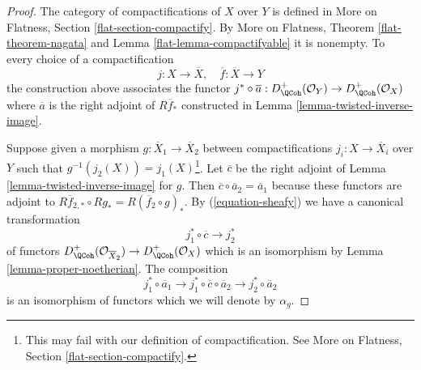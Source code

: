 \begin{proof}
The category of compactifications of $X$ over $Y$ is defined
in More on Flatness, Section \ref{flat-section-compactify}.
By More on Flatness, Theorem \ref{flat-theorem-nagata} and
Lemma \ref{flat-lemma-compactifyable} it is nonempty.
To every choice of a compactification
$$
j : X \to \overline{X},\quad \overline{f} : \overline{X} \to Y
$$
the construction above associates the functor $j^* \circ \overline{a} :
D_\QCoh^+(\mathcal{O}_Y) \to D_\QCoh^+(\mathcal{O}_X)$
where $\overline{a}$ is the right adjoint of $R\overline{f}_*$
constructed in Lemma \ref{lemma-twisted-inverse-image}.

\medskip\noindent
Suppose given a morphism $g : \overline{X}_1 \to \overline{X}_2$
between compactifications $j_i : X \to \overline{X}_i$ over $Y$
such that $g^{-1}(j_2(X)) = j_1(X)$\footnote{This may fail
with our definition of compactification. See
More on Flatness, Section \ref{flat-section-compactify}.}.
Let $\overline{c}$ be the right adjoint of
Lemma \ref{lemma-twisted-inverse-image} for $g$.
Then $\overline{c} \circ \overline{a}_2 = \overline{a}_1$
because these functors are adjoint to
$R\overline{f}_{2, *} \circ Rg_* = R(\overline{f}_2 \circ g)_*$.
By (\ref{equation-sheafy}) we have a canonical transformation
$$
j_1^* \circ \overline{c} \longrightarrow j_2^*
$$
of functors
$D^+_\QCoh(\mathcal{O}_{\overline{X}_2}) \to D^+_\QCoh(\mathcal{O}_X)$
which is an isomorphism by Lemma \ref{lemma-proper-noetherian}.
The composition
$$
j_1^* \circ \overline{a}_1 \longrightarrow
j_1^* \circ \overline{c} \circ \overline{a}_2 \longrightarrow
j_2^* \circ \overline{a}_2
$$
is an isomorphism of functors which we will denote by $\alpha_g$.


\end{proof}
